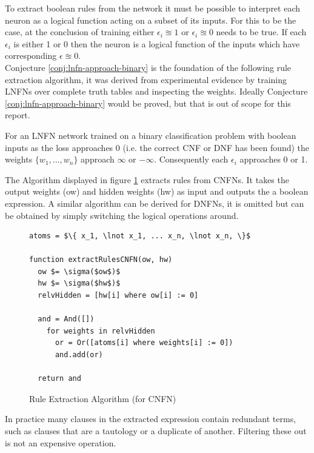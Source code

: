 To extract boolean rules from the network it must be possible to interpret each neuron as a logical function acting on a subset of its inputs. For this to be the case, at the conclusion of training either $\epsilon_i \approxeq 1$ or $\epsilon_i \approxeq 0$ needs to be true. If each $\epsilon_i$ is either 1 or 0 then the neuron is a logical function of the inputs which have corresponding $\epsilon \approxeq 0$.\\

Conjecture \ref{conj:lnfn-approach-binary} is the foundation of the following rule extraction algorithm, it was derived from experimental evidence by training LNFNs over complete truth tables and inspecting the weights. Ideally Conjecture \ref{conj:lnfn-approach-binary} would be proved, but that is out of scope for this report.

\begin{conjecture}
	For an LNFN network trained on a binary classification problem with boolean inputs as the loss approaches 0  (i.e. the correct CNF or DNF has been found) the weights $\{ w_1, ..., w_n \}$ approach $\infty$ or $-\infty$. Consequently each $\epsilon_i$ approaches 0 or 1.
	\label{conj:lnfn-approach-binary}
\end{conjecture}

The Algorithm displayed in figure \ref{alg:rule-extraction} extracts rules from CNFNs. It takes the output weights (ow) and hidden weights (hw) as input and outputs the a boolean expression. A similar algorithm can be derived for DNFNs, it is omitted but can be obtained by simply switching the logical operations around.

\begin{figure}[H]
	\begin{lstlisting}[mathescape=true]
atoms = $\{ x_1, \lnot x_1, ... x_n, \lnot x_n, \}$
	
function extractRulesCNFN(ow, hw)
  ow $= \sigma($ow$)$
  hw $= \sigma($hw$)$
  relvHidden = [hw[i] where ow[i] := 0]
		
  and = And([])
    for weights in relvHidden
      or = Or([atoms[i] where weights[i] := 0])
      and.add(or)
		
  return and
	\end{lstlisting}
	\caption{Rule Extraction Algorithm (for CNFN)}
	\label{alg:rule-extraction}
\end{figure}

In practice many clauses in the extracted expression contain redundant terms, such as clauses that are a tautology or a duplicate of another. Filtering these out is not an expensive operation.\\

